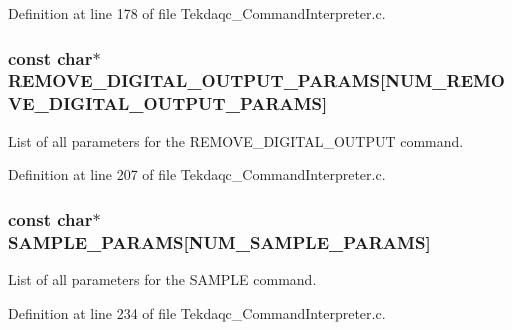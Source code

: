 Definition at line 178 of file Tekdaqc\-\_\-\-Command\-Interpreter.\-c.

\hypertarget{group__command__interpreter_gab8e88e0e75930f03474e1ff9e232ef63}{
\subsubsection[{R\-E\-M\-O\-V\-E\-\_\-\-D\-I\-G\-I\-T\-A\-L\-\_\-\-O\-U\-T\-P\-U\-T\-\_\-\-P\-A\-R\-A\-M\-S}]{\setlength{\rightskip}{0pt plus 5cm}const char$\ast$ R\-E\-M\-O\-V\-E\-\_\-\-D\-I\-G\-I\-T\-A\-L\-\_\-\-O\-U\-T\-P\-U\-T\-\_\-\-P\-A\-R\-A\-M\-S\mbox{[}{\bf N\-U\-M\-\_\-\-R\-E\-M\-O\-V\-E\-\_\-\-D\-I\-G\-I\-T\-A\-L\-\_\-\-O\-U\-T\-P\-U\-T\-\_\-\-P\-A\-R\-A\-M\-S}\mbox{]}}}\label{group__command__interpreter_gab8e88e0e75930f03474e1ff9e232ef63}
List of all parameters for the R\-E\-M\-O\-V\-E\-\_\-\-D\-I\-G\-I\-T\-A\-L\-\_\-\-O\-U\-T\-P\-U\-T command. 

Definition at line 207 of file Tekdaqc\-\_\-\-Command\-Interpreter.\-c.

\hypertarget{group__command__interpreter_ga7008aaf205ddd844e0a5affd12a08775}{
\subsubsection[{S\-A\-M\-P\-L\-E\-\_\-\-P\-A\-R\-A\-M\-S}]{\setlength{\rightskip}{0pt plus 5cm}const char$\ast$ S\-A\-M\-P\-L\-E\-\_\-\-P\-A\-R\-A\-M\-S\mbox{[}{\bf N\-U\-M\-\_\-\-S\-A\-M\-P\-L\-E\-\_\-\-P\-A\-R\-A\-M\-S}\mbox{]}}}\label{group__command__interpreter_ga7008aaf205ddd844e0a5affd12a08775}
List of all parameters for the S\-A\-M\-P\-L\-E command. 

Definition at line 234 of file Tekdaqc\-\_\-\-Command\-Interpreter.\-c.


